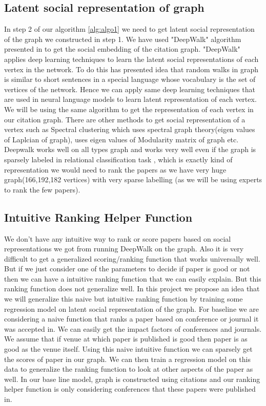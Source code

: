 \documentclass[a4paper, 11pt]{article}
\begin{document}
\subsection{Latent social representation of graph}
In step 2 of our algorithm \ref{alg:algo1} we need to get latent social representation of the graph we constructed in step 1. We have used "DeepWalk" algorithm presented in \cite{deepwalk} to get the social embedding of the citation graph. "DeepWalk" applies deep learning techniques to learn the latent social representations of each vertex in the network. To do this \cite{deepwalk} has presented idea that random walks in graph is similar to short sentences in a special language whose vocabulary is the set of vertices of the network. Hence we can apply same deep learning techniques that are used in neural language models to learn latent representation of each vertex. We will be using the same algorithm to get the representation of each vertex in our citation graph. There are other methods to get social representation of a vertex such as Spectral clustering\cite{tang2011leveraging} which uses spectral graph theory(eigen values of Laplcian of graph), \cite{tang2009relational} uses eigen values of Modularity matrix of graph etc. Deepwalk works well on all types graph and works very well even if the graph is sparsely labeled in relational classification task \cite{deepwalk}, which is exactly kind of representation we would need to rank the papers as we have very huge graph(166,192,182 vertices) with very sparse labelling (as we will be using experts to rank the few papers). 
\subsection{Intuitive Ranking Helper Function}
We don't have any intuitive way to rank or score papers based on social representations we got from running DeepWalk on the graph. Also it is very difficult to get a generalized scoring/ranking function that works universally well. But if we just consider one of the parameters to decide if paper is good or not then we can have a intuitive ranking function that we can easily explain. But this ranking function does not generalize well. In this project we propose an idea that we will generalize this naive but intuitive ranking function by training some regression model on latent social representation of the graph. For baseline we are considering a naive function that ranks a paper based on conference or journal it was accepted in.  We can easily get the impact factors of conferences and journals. We assume that if venue at which paper is published is good then paper is as good as the venue itself. Using this naive intuitive function we can sparsely get the scores of paper in our graph. We can then train a regression model on this data to generalize the ranking function to look at other aspects of the paper as well. In our base line model, graph is constructed using citations and our ranking helper function is only considering conferences that these papers were published in. 
\end{document}
